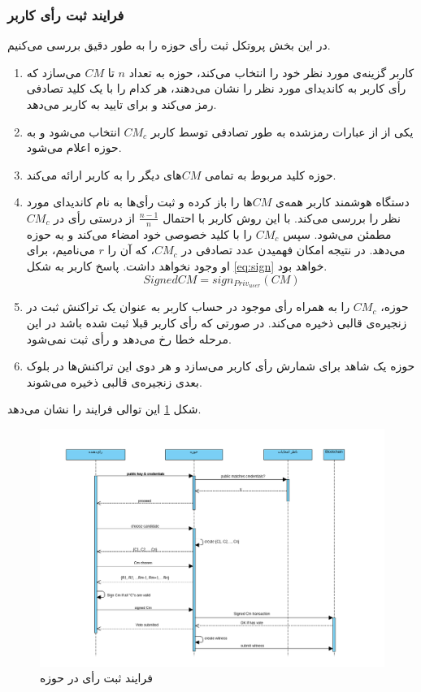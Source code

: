 \subsubsection{فرایند ثبت رأی کاربر}
در این بخش پروتکل ثبت رأی حوزه را به طور دقیق بررسی می‌کنیم. 

\begin{enumerate}
	\item 
	کاربر گزینه‌ی مورد نظر خود را انتخاب می‌کند، حوزه به تعداد $n$ تا $CM$ می‌سازد که رأی کاربر به کاندیدای مورد نظر را نشان می‌دهند، هر کدام را با یک کلید تصادفی رمز می‌کند و برای تایید به کاربر می‌دهد. 
	\item 
	یکی از از عبارات رمزشده به طور تصادفی توسط کاربر $CM_c$ انتخاب می‌شود و به حوزه اعلام می‌شود.
	\item 
	حوزه کلید مربوط به تمامی $CM$های دیگر را به کاربر ارائه می‌کند.
	\item 
	دستگاه هوشمند کاربر همه‌ی $CM$ها را باز کرده و ثبت رأی‌ها به نام کاندیدای مورد نظر را بررسی می‌کند. با این روش کاربر با احتمال $\frac{n-1}{n}$ از درستی رأی در $CM_c$ مطمئن می‌شود. سپس $CM_c$ را با کلید خصوصی خود امضاء می‌کند و به حوزه می‌دهد. در نتیجه‌ امکان فهمیدن عدد تصادفی در $CM_c$، که آن را $r$ می‌نامیم، برای او وجود نخواهد داشت. پاسخ کاربر به شکل \ref{eq:sign} خواهد بود.
	\begin{equation}
	SignedCM = sign_{Priv_{user}} (CM)
	\label{eq:sign}
	\end{equation}
	
	\item
	حوزه، $CM_c$ را به همراه رأی موجود در حساب کاربر به عنوان یک تراکنش ثبت در زنجیره‌ی قالبی ذخیره می‌کند. در صورتی که رأی کاربر قبلا ثبت شده باشد در این مرحله خطا رخ می‌دهد و رأی ثبت نمی‌شود. 
	\item
	حوزه یک شاهد برای شمارش رأی کاربر می‌سازد و هر دوی این تراکنش‌ها در بلوک بعدی زنجیره‌ی قالبی ذخیره می‌شوند.
\end{enumerate}
شکل \ref{fig:seqdiag.png} این توالی فرایند را نشان می‌دهد.
\begin{figure}[h!]
	\centering
	\includegraphics[width=0.9\linewidth]{seqdiag.png}
	\caption {فرایند ثبت رأی در حوزه}
	\label{fig:seqdiag.png}
\end{figure}

